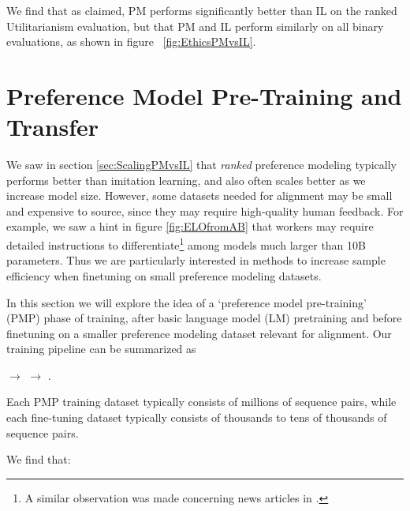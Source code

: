 We find that as claimed, PM performs significantly better than IL on the ranked Utilitarianism evaluation, but that PM and IL perform similarly on all binary evaluations, as shown in figure ~\ref{fig:EthicsPMvsIL}.  

\section{Preference Model Pre-Training and Transfer}
\label{sec:UPM}

We saw in section \ref{sec:ScalingPMvsIL} that {\it ranked} preference modeling typically performs better than imitation learning, and also often scales  better as we increase model size.  However, some datasets needed for alignment may be small and expensive to source, since they may require high-quality human feedback.  For example, we saw a hint  in figure \ref{fig:ELOfromAB} that workers may require detailed instructions to differentiate\footnote{A similar observation was made concerning news articles in \cite{brown2020language}.} among models much larger than 10B parameters.  Thus we are particularly interested in methods to increase sample efficiency when finetuning on small preference modeling datasets.

In this section we will explore the idea of a `preference model pre-training' (PMP) phase of training, after basic language model (LM) pretraining and before finetuning on a smaller preference modeling dataset relevant for alignment. Our training pipeline can be summarized as

\begin{center}
     $\rightarrow$  $\rightarrow$ .
\end{center}

Each PMP training dataset typically consists of millions of sequence pairs, while each fine-tuning dataset typically consists of thousands to tens of thousands of sequence pairs.  

We find that:

